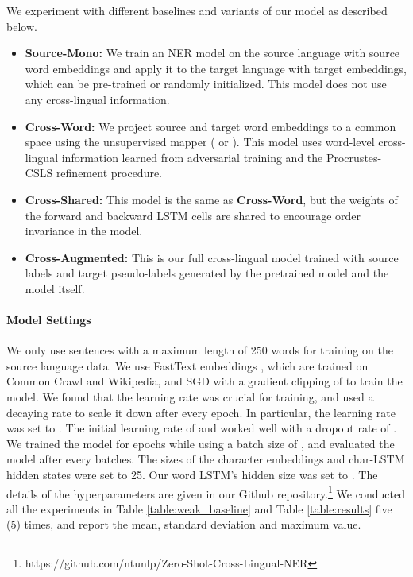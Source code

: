 \documentclass[letterpaper]{article} \usepackage{aaai20}  \usepackage{times}  \usepackage{helvet} \usepackage{courier}  \usepackage[hyphens]{url}  \usepackage{graphicx} \urlstyle{rm} \def\UrlFont{\rm}  \usepackage{graphicx}  \frenchspacing  \setlength{\pdfpagewidth}{8.5in}  \setlength{\pdfpageheight}{11in}
\begin{document}
We experiment with different baselines and variants of our model as described below. 


\begin{itemize}[itemsep=0.0em]

    \item \textbf{Source-Mono:} We train an NER model on the source language with source word embeddings and apply it to the target language with target embeddings, which can be pre-trained or randomly initialized. This model does not use any cross-lingual information.
    
    \item \textbf{Cross-Word:} We project source and target word embeddings to a common space using the unsupervised mapper ( or ). This model uses word-level cross-lingual information learned from adversarial training and the Procrustes-CSLS refinement procedure.

    \item \textbf{Cross-Shared:} This model is the same as \textbf{Cross-Word}, but the weights of the forward and backward LSTM cells are shared to encourage order invariance in the model.  

    \item \textbf{Cross-Augmented:} This is our full cross-lingual model trained with source labels and target pseudo-labels generated by the pretrained model and the model itself.
    
\end{itemize}





\paragraph{Model Settings}


We only use sentences with a maximum length of 250 words for training on the source language data. We use FastText embeddings \cite{grave2018learning}, which are trained on Common Crawl and Wikipedia, and SGD  with a gradient clipping of  to train the model. We found that the learning rate was crucial for training, and used a decaying rate to scale it down after every epoch. In particular, the learning rate was set to . The initial learning rate of  and  worked well with a dropout rate of . We trained the model for  epochs while using a batch size of , and evaluated the model after every  batches. The sizes of the character embeddings and char-LSTM hidden states were set to 25. Our word LSTM's hidden size was set to . {The details of the hyperparameters are given in our Github repository.\footnote{https://github.com/ntunlp/Zero-Shot-Cross-Lingual-NER} We conducted all the experiments in Table \ref{table:weak_baseline} and Table \ref{table:results}  five (5) times, and report the mean, standard deviation and maximum value.} 
\end{document}
